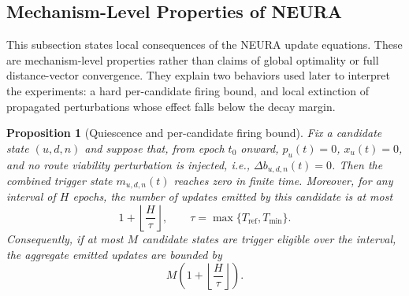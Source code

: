 \documentclass[5p,times]{elsarticle}
\newtheorem{proposition}{Proposition}
\begin{document}
\subsection{Mechanism-Level Properties of NEURA}

This subsection states local consequences of the NEURA update equations. These are mechanism-level properties rather than claims of global optimality or full distance-vector convergence. They explain two behaviors used later to interpret the experiments: a hard per-candidate firing bound, and local extinction of propagated perturbations whose effect falls below the decay margin.

\begin{proposition}[Quiescence and per-candidate firing bound]
\label{prop:quiescent-bound}
Fix a candidate state $(u,d,n)$ and suppose that, from epoch $t_0$ onward, $p_u(t)=0$, $x_u(t)=0$, and no route viability perturbation is injected, i.e., $\Delta b_{u,d,n}(t)=0$. Then the combined trigger state $m_{u,d,n}(t)$ reaches zero in finite time. Moreover, for any interval of $H$ epochs, the number of updates emitted by this candidate is at most
\begin{equation}
1+\left\lfloor \frac{H}{\tau} \right\rfloor,
\qquad
\tau=\max\{T_{\mathrm{ref}},T_{\min}\}.
\end{equation}
Consequently, if at most $M$ candidate states are trigger eligible over the interval, the aggregate emitted updates are bounded by
\begin{equation}
M\left(1+\left\lfloor \frac{H}{\tau} \right\rfloor\right).
\end{equation}
\end{proposition}
\end{document}

